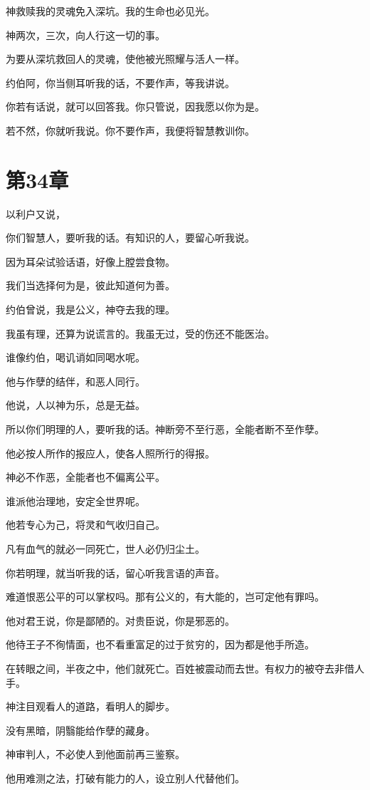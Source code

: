 \documentclass[12pt,oneside]{book}
\begin{document}
神救赎我的灵魂免入深坑。我的生命也必见光。

神两次，三次，向人行这一切的事。

为要从深坑救回人的灵魂，使他被光照耀与活人一样。

约伯阿，你当侧耳听我的话，不要作声，等我讲说。

你若有话说，就可以回答我。你只管说，因我愿以你为是。

若不然，你就听我说。你不要作声，我便将智慧教训你。


\chapter{第34章}
以利户又说，

你们智慧人，要听我的话。有知识的人，要留心听我说。

因为耳朵试验话语，好像上膛尝食物。

我们当选择何为是，彼此知道何为善。

约伯曾说，我是公义，神夺去我的理。

我虽有理，还算为说谎言的。我虽无过，受的伤还不能医治。

谁像约伯，喝讥诮如同喝水呢。

他与作孽的结伴，和恶人同行。

他说，人以神为乐，总是无益。

所以你们明理的人，要听我的话。神断旁不至行恶，全能者断不至作孽。

他必按人所作的报应人，使各人照所行的得报。

神必不作恶，全能者也不偏离公平。

谁派他治理地，安定全世界呢。

他若专心为己，将灵和气收归自己。

凡有血气的就必一同死亡，世人必仍归尘土。

你若明理，就当听我的话，留心听我言语的声音。

难道恨恶公平的可以掌权吗。那有公义的，有大能的，岂可定他有罪吗。

他对君王说，你是鄙陋的。对贵臣说，你是邪恶的。

他待王子不徇情面，也不看重富足的过于贫穷的，因为都是他手所造。

在转眼之间，半夜之中，他们就死亡。百姓被震动而去世。有权力的被夺去非借人手。

神注目观看人的道路，看明人的脚步。

没有黑暗，阴翳能给作孽的藏身。

神审判人，不必使人到他面前再三鉴察。

他用难测之法，打破有能力的人，设立别人代替他们。
\end{document}

